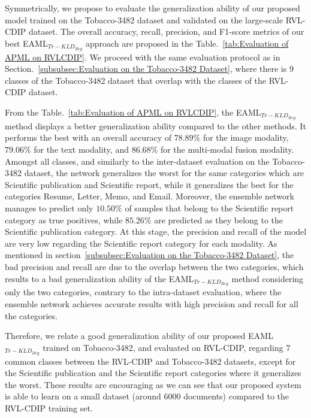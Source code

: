 \documentclass[twocolumn]{svjour3}
\begin{document}
Symmetrically, we propose to evaluate the generalization ability of our proposed model trained on the Tobacco-3482 dataset and validated on the large-scale RVL-CDIP dataset. The overall accuracy, recall, precision, and F1-score metrics of our best EAML$_{{Tr-KLD}_{Reg}}$ approach are proposed in the Table.~\ref{tab:Evaluation of APML on RVLCDIP}.        
We proceed with the same evaluation protocol as in Section.~\ref{subsubsec:Evaluation on the Tobacco-3482 Dataset}, where there is 9 classes of the Tobacco-3482 dataset that overlap with the classes of the RVL-CDIP dataset.

From the Table.~\ref{tab:Evaluation of APML on RVLCDIP}, the EAML$_{{Tr-KLD}_{Reg}}$ method displays a better generalization ability compared to the other methods. It performs the best with an overall accuracy of $78.89\%$ for the image modality, $79.06\%$ for the text modality, and $86.68\%$ for the multi-modal fusion modality. Amongst all classes, and similarly to the inter-dataset evaluation on the Tobacco-3482 dataset, the network generalizes the worst for the same categories which are Scientific publication and Scientific report, while it generalizes the best for the categories Resume, Letter, Memo, and Email. Moreover, the ensemble network manages to predict only $10.50\%$ of samples that belong to the Scientific report category as true positives, while $85.26\%$ are predicted as they belong to the Scientific publication category. At this stage, the precision and recall of the model are very low regarding the Scientific report category for each modality. As mentioned in section~\ref{subsubsec:Evaluation on the Tobacco-3482 Dataset}, the bad precision and recall are due to the overlap between the two categories, which results to a bad generalization ability of the EAML$_{{Tr-KLD}_{Reg}}$ method considering only the two categories, contrary to the intra-dataset evaluation, where the ensemble network achieves accurate results with high precision and recall for all the categories.

Therefore, we relate a good generalization ability of our proposed EAML$_{{Tr-KLD}_{Reg}}$ trained on Tobacco-3482, and evaluated on RVL-CDIP, regarding 7 common classes between the RVL-CDIP and Tobacco-3482 datasets, except for the Scientific publication and the Scientific report categories where it generalizes the worst. These results are encouraging as we can see that our proposed system is able to learn on a small dataset (around 6000 documents) compared to the RVL-CDIP training set.
\end{document}
